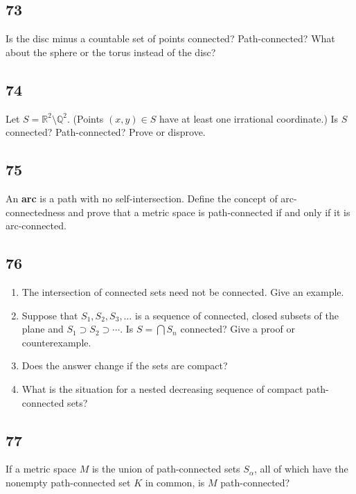 \documentclass{amsart}
\begin{document}
\subsection*{73}
Is the disc minus a countable set of points connected? Path-connected? What about the sphere or the torus instead of the disc?

\subsection*{74}
Let $S = \mathbb{R}^2 \setminus \mathbb{Q}^2$. (Points $(x,y) \in S$ have at least one irrational coordinate.) Is $S$ connected? Path-connected? Prove or disprove.

\subsection*{75}
An \textbf{arc} is a path with no self-intersection. Define the concept of arc-connectedness and prove that a metric space is path-connected if and only if it is arc-connected.

\subsection*{76}
\begin{enumerate}[label=(\alph*)]
\item The intersection of connected sets need not be connected. Give an example.
\item Suppose that $S_1, S_2, S_3, \ldots$ is a sequence of connected, closed subsets of the plane and $S_1 \supset S_2 \supset \cdots$. Is $S = \bigcap S_n$ connected? Give a proof or counterexample.
\item[*(c)] Does the answer change if the sets are compact?
\item What is the situation for a nested decreasing sequence of compact path-connected sets?
\end{enumerate}

\subsection*{77}
If a metric space $M$ is the union of path-connected sets $S_\alpha$, all of which have the nonempty path-connected set $K$ in common, is $M$ path-connected?
\end{document}
